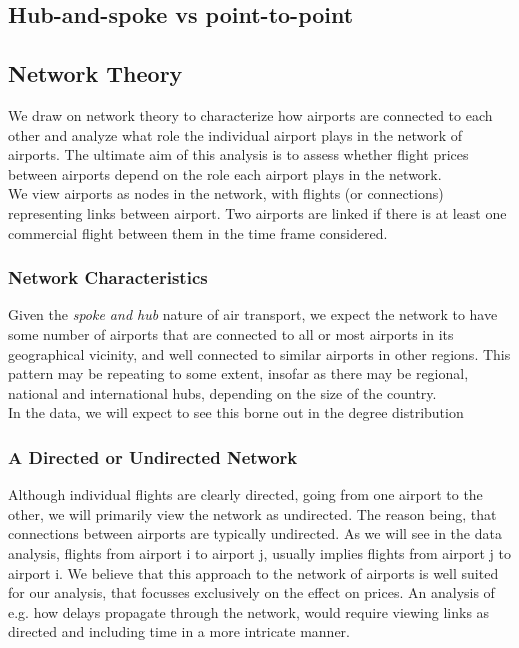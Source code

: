 \label{sec:theory}

\subsection{Hub-and-spoke vs point-to-point}


\subsection{Network Theory}
\label{subsec:Network Theory}
We draw on network theory to characterize how airports are connected to each other and analyze what role the individual airport plays in the network of airports. The ultimate aim of this analysis is to assess whether flight prices between airports depend on the role each airport plays in the network. \\
We view airports as nodes in the network, with flights (or connections) representing links between airport. Two airports are linked if there is at least one commercial flight between them in the time frame considered. \\

\subsubsection{Network Characteristics}
Given the \textit{spoke and hub} nature of air transport, we expect the network to have some number of airports that are connected to all or most airports in its geographical vicinity, and well connected to similar airports in other regions. This pattern may be repeating to some extent, insofar as there may be regional, national and international hubs, depending on the size of the country. \\
In the data, we will expect to see this borne out in the degree distribution

\subsubsection{A Directed or Undirected Network}
Although individual flights are clearly directed, going from one airport to the other, we will primarily view the network as undirected. The reason being, that connections between airports are typically undirected. 
As we will see in the data analysis, flights from airport i to airport j, usually implies flights from airport j to airport i. We believe that this approach to the network of airports is well suited for our analysis, that focusses exclusively on the effect on prices. An analysis of e.g. how delays propagate through the network, would require viewing links as directed and including time in a more intricate manner.\\





